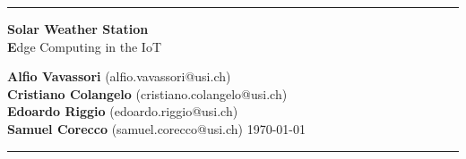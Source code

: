 \documentclass{scrartcl}
\begin{document}
    \thispagestyle{plain}

    \begin{center}
        \hrule

        \vspace{.4cm}
        {\textbf {\Huge Solar Weather Station}} \\
        \vspace{.2cm}
        {\textbf Edge Computing in the IoT}
        \vspace{.2cm}
    \end{center}
    {\textbf {Alfio Vavassori} } (alfio.vavassori@usi.ch) \hspace{\fill} \\
    {\textbf {Cristiano Colangelo} } (cristiano.colangelo@usi.ch) \hspace{\fill} \\
    {\textbf {Edoardo Riggio} } (edoardo.riggio@usi.ch) \hspace{\fill} \\
    {\textbf {Samuel Corecco} } (samuel.corecco@usi.ch) \hspace{\fill}\today \\
    \hrule
    \vspace{.2cm}

    
    
    
\end{document}
